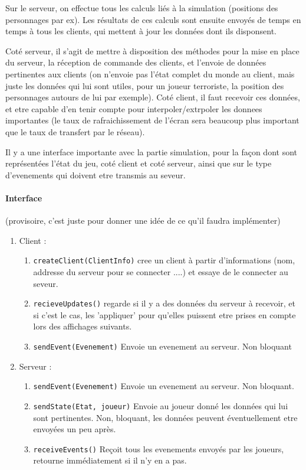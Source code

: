 \documentclass[a4paper,10pt]{article}
\begin{document}
Sur le serveur, on effectue tous les calculs liés à la simulation (positions des personnages par ex). Les résultats de ces calculs sont ensuite envoyés de temps en temps à tous les clients, qui mettent à jour les données dont ils disponsent.

Coté serveur, il s'agit de mettre à disposition des méthodes pour la mise en place du serveur, la réception de commande des clients, et l'envoie de données pertinentes aux clients (on n'envoie pas l'état complet du monde au client, mais juste les données qui lui sont utiles, pour un joueur terroriste, la position des personnages autours de lui par exemple). Coté client, il faut recevoir ces données, et etre capable d'en tenir compte pour interpoler/extrpoler les donnees importantes (le taux de rafraichissement de l'écran sera beaucoup plus important que le taux de transfert par le réseau).

Il y a une interface importante avec la partie simulation, pour la façon dont sont représentées l'état du jeu, coté client et coté serveur, ainsi que sur le type d'evenements qui doivent etre transmis au seveur.
\paragraph{Interface} (provisoire, c'est juste pour donner une idée de ce qu'il faudra implémenter)
\begin{enumerate}
 \item Client : \begin{enumerate}
        \item \verb!createClient(ClientInfo)! cree un client à partir d'informations (nom, addresse du serveur pour se connecter ....) et essaye de le connecter au seveur.
        \item \verb!recieveUpdates()! regarde si il y a des données du serveur à recevoir, et si c'est le cas, les 'appliquer' pour qu'elles puissent etre prises en compte lors des affichages suivants.
        \item \verb!sendEvent(Evenement)! Envoie un evenement au serveur. Non bloquant
       \end{enumerate}
\item Serveur : \begin{enumerate}
                 \item \verb!sendEvent(Evenement)! Envoie un evenement au serveur. Non bloquant.
                 \item \verb!sendState(Etat, joueur)! Envoie au joueur donné les données qui lui sont pertinentes. Non, bloquant, les données peuvent éventuellement etre envoyées un peu après.
                 \item \verb!receiveEvents()! Reçoit tous les evenements envoyés par les joueurs, retourne immédiatement si il n'y en a pas.
                \end{enumerate}

\end{enumerate}
\end{document}
